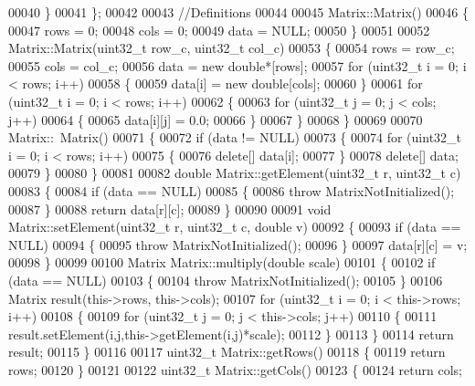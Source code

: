 \begin{DoxyCode}
{00040     \}
00041 \};
00042 
00043 \textcolor{comment}{//Definitions}
00044 
00045 Matrix::Matrix()
00046 \{
00047     rows = 0;
00048     cols = 0;
00049     data = NULL;
00050 \}
00051 
00052 Matrix::Matrix(uint32\_t row\_c, uint32\_t col\_c)
00053 \{
00054     rows = row\_c;
00055     cols = col\_c;
00056     data = \textcolor{keyword}{new} \textcolor{keywordtype}{double}*[rows];
00057     \textcolor{keywordflow}{for} (uint32\_t i = 0; i < rows; i++)
00058     \{
00059         data[i] = \textcolor{keyword}{new} \textcolor{keywordtype}{double}[cols];
00060     \}
00061     \textcolor{keywordflow}{for} (uint32\_t i = 0; i < rows; i++)
00062     \{
00063         \textcolor{keywordflow}{for} (uint32\_t j = 0; j < cols; j++)
00064         \{
00065             data[i][j] = 0.0;
00066         \}
00067     \}
00068 \}
00069 
00070 Matrix::~Matrix()
00071 \{
00072     \textcolor{keywordflow}{if} (data != NULL)
00073     \{
00074         \textcolor{keywordflow}{for} (uint32\_t i = 0; i < rows; i++)
00075         \{
00076             \textcolor{keyword}{delete}[] data[i];
00077         \}
00078         \textcolor{keyword}{delete}[] data;
00079     \}
00080 \}
00081 
00082 \textcolor{keywordtype}{double} Matrix::getElement(uint32\_t r, uint32\_t c)
00083 \{
00084     \textcolor{keywordflow}{if} (data == NULL)
00085     \{
00086         \textcolor{keywordflow}{throw} MatrixNotInitialized();
00087     \}
00088     \textcolor{keywordflow}{return} data[r][c];
00089 \}
00090 
00091 \textcolor{keywordtype}{void} Matrix::setElement(uint32\_t r, uint32\_t c, \textcolor{keywordtype}{double} v)
00092 \{
00093     \textcolor{keywordflow}{if} (data == NULL)
00094     \{
00095         \textcolor{keywordflow}{throw} MatrixNotInitialized();
00096     \}
00097     data[r][c] = v;
00098 \}
00099 
00100 Matrix Matrix::multiply(\textcolor{keywordtype}{double} scale)
00101 \{
00102     \textcolor{keywordflow}{if} (data == NULL)
00103     \{
00104         \textcolor{keywordflow}{throw} MatrixNotInitialized();
00105     \}
00106     Matrix result(this->rows, this->cols);
00107     \textcolor{keywordflow}{for} (uint32\_t i = 0; i < this->rows; i++)
00108     \{
00109         \textcolor{keywordflow}{for} (uint32\_t j = 0; j < this->cols; j++)
00110         \{
00111             result.setElement(i,j,this->getElement(i,j)*scale);
00112         \}
00113     \}
00114     \textcolor{keywordflow}{return} result;
00115 \}
00116 
00117 uint32\_t Matrix::getRows()
00118 \{
00119     \textcolor{keywordflow}{return} rows;
00120 \}
00121 
00122 uint32\_t Matrix::getCols()
00123 \{
00124     \textcolor{keywordflow}{return} cols;
}
\end{DoxyCode}
